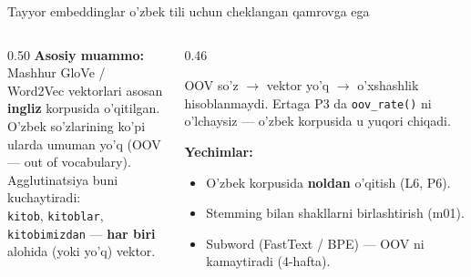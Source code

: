\documentclass[aspectratio=169,11pt]{beamer}
\begin{document}
\begin{frame}{Tayyor embeddinglar o'zbek tili uchun cheklangan qamrovga ega}
  \begin{columns}[T]
    \begin{column}{0.50\textwidth}
      \textbf{Asosiy muammo:}\\[4pt]
      \small
      Mashhur GloVe / Word2Vec vektorlari asosan \textbf{ingliz}
      korpusida o'qitilgan.\\[4pt]
      O'zbek so'zlarining ko'pi ularda \alert{umuman yo'q} (OOV ---
      out of vocabulary).\\[4pt]
      Agglutinatsiya buni kuchaytiradi:\\
      \texttt{kitob}, \texttt{kitoblar}, \texttt{kitobimizdan} ---
      \textbf{har biri} alohida (yoki yo'q) vektor.
    \end{column}
    \begin{column}{0.46\textwidth}
      \begin{tcolorbox}[warnbox,title=OOV ta'siri,top=2pt,bottom=2pt]
        \footnotesize
        OOV so'z $\to$ vektor yo'q $\to$ o'xshashlik hisoblanmaydi.
        Ertaga P3 da \texttt{oov\_rate()} ni o'lchaysiz --- o'zbek
        korpusida u yuqori chiqadi.
      \end{tcolorbox}
      \vspace{4pt}
      \textbf{Yechimlar:}\\[3pt]
      \footnotesize
      \begin{itemize}\setlength\itemsep{2pt}
        \item O'zbek korpusida \textbf{noldan} o'qitish (L6, P6).
        \item Stemming bilan shakllarni birlashtirish (m01).
        \item Subword (FastText / BPE) --- OOV ni kamaytiradi (4-hafta).
      \end{itemize}
    \end{column}
  \end{columns}
\end{frame}
\end{document}
